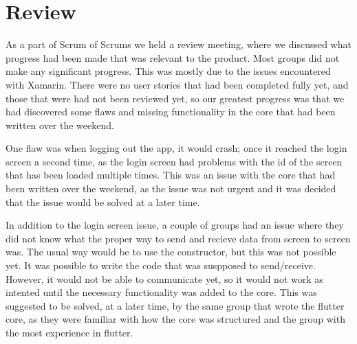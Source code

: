 \section{Review}
As a part of Scrum of Scrums we held a review meeting, where we discussed what progress had been made that was relevant to the product.
Most groups did not make any significant progress.
This was mostly due to the issues encountered with Xamarin.
There were no user stories that had been completed fully yet, and those that were had not been reviewed yet, so our greatest progress was that we had discovered some flaws and missing functionality in the core that had been written over the weekend.

One flaw was when logging out the app, it would crash; once it reached the login screen a second time, as the login screen had problems with the id of the screen that has been loaded multiple times. 
This was an issue with the core that had been written over the weekend, as the issue was not urgent and it was decided that the issue would be solved at a later time.

In addition to the login screen issue, a couple of groups had an issue where they did not know what the proper way to send and recieve data from screen to screen was.
The usual way would be to use the constructor, but this was not possible yet. 
It was possible to write the code that was suspposed to send/receive. 
However, it would not be able to communicate yet, so it would not work as intented until the necessary functionality was added to the core.
This was suggested to be solved, at a later time, by the same group that wrote the flutter core, as they were familiar with how the core was structured and the group with the most experience in flutter.
